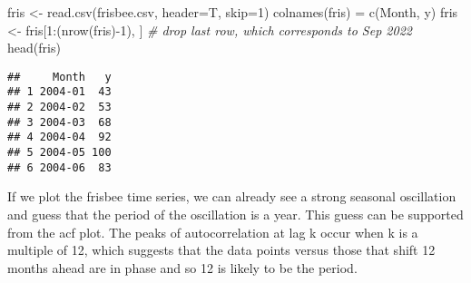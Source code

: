 \documentclass[
]{article}
\newenvironment{Shaded}{\begin{snugshade}}{\end{snugshade}}
\newcommand{\AttributeTok}[1]{\textcolor[rgb]{0.77,0.63,0.00}{#1}}
\newcommand{\CommentTok}[1]{\textcolor[rgb]{0.56,0.35,0.01}{\textit{#1}}}
\newcommand{\DecValTok}[1]{\textcolor[rgb]{0.00,0.00,0.81}{#1}}
\newcommand{\FunctionTok}[1]{\textcolor[rgb]{0.00,0.00,0.00}{#1}}
\newcommand{\NormalTok}[1]{#1}
\newcommand{\OtherTok}[1]{\textcolor[rgb]{0.56,0.35,0.01}{#1}}
\newcommand{\SpecialCharTok}[1]{\textcolor[rgb]{0.00,0.00,0.00}{#1}}
\newcommand{\StringTok}[1]{\textcolor[rgb]{0.31,0.60,0.02}{#1}}
\begin{document}
\begin{Shaded}
\begin{Highlighting}[]
\NormalTok{fris }\OtherTok{\textless{}{-}} \FunctionTok{read.csv}\NormalTok{(}\StringTok{\textquotesingle{}frisbee.csv\textquotesingle{}}\NormalTok{, }\AttributeTok{header=}\NormalTok{T, }\AttributeTok{skip=}\DecValTok{1}\NormalTok{)}
\FunctionTok{colnames}\NormalTok{(fris) }\OtherTok{=} \FunctionTok{c}\NormalTok{(}\StringTok{\textquotesingle{}Month\textquotesingle{}}\NormalTok{, }\StringTok{\textquotesingle{}y\textquotesingle{}}\NormalTok{)}
\NormalTok{fris }\OtherTok{\textless{}{-}}\NormalTok{ fris[}\DecValTok{1}\SpecialCharTok{:}\NormalTok{(}\FunctionTok{nrow}\NormalTok{(fris)}\SpecialCharTok{{-}}\DecValTok{1}\NormalTok{), ] }\CommentTok{\# drop last row, which corresponds to Sep 2022}
\FunctionTok{head}\NormalTok{(fris)}
\end{Highlighting}
\end{Shaded}

\begin{verbatim}
##     Month   y
## 1 2004-01  43
## 2 2004-02  53
## 3 2004-03  68
## 4 2004-04  92
## 5 2004-05 100
## 6 2004-06  83
\end{verbatim}

\begin{Shaded}
\end{Shaded}

If we plot the frisbee time series, we can already see a strong seasonal
oscillation and guess that the period of the oscillation is a year. This
guess can be supported from the acf plot. The peaks of autocorrelation
at lag k occur when k is a multiple of 12, which suggests that the data
points versus those that shift 12 months ahead are in phase and so 12 is
likely to be the period.

\begin{Shaded}
\end{Shaded}
\end{document}
